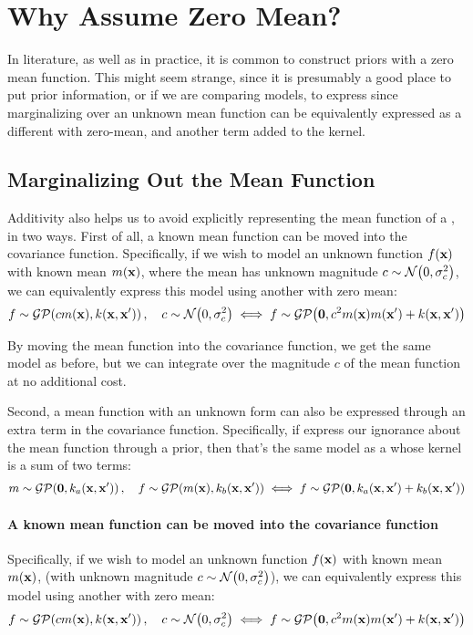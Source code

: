 \iffalse
\section{Why Assume Zero Mean?}

In literature, as well as in practice, it is common to construct \gp{} priors with a zero mean function.
This might seem strange, since it is presumably a good place to put prior information, or if we are comparing models, to express  since marginalizing over an unknown mean function can be equivalently expressed as a different \gp{} with zero-mean, and another term added to the kernel.


\subsection{Marginalizing Out the Mean Function}

Additivity also helps us to avoid explicitly representing the mean function of a \gp{}, in two ways.
First of all, a known mean function can be moved into the covariance function.
Specifically, if we wish to model an unknown function $f({\bf{x}})$ with known mean $m({\bf{x}})$, where the mean has unknown magnitude $c \sim \mathcal{N}\!\left(0,\sigma^2_c\right)$, we can equivalently express this model using another \gp{} with zero mean:
%
\begin{align}
f \sim \mathcal{GP}\!\left(c m({\bf{x}}),k({\bf{x}},{\bf{x}}')\right), \quad c \sim \mathcal{N}\!\left(0,\sigma^2_c\right)
\iff f \sim \mathcal{GP}\!\left( {\bf{0}} , c^2 m({\bf{x}}) m({\bf{x}}') + k({\bf{x}},{\bf{x}}')\right)
\end{align}

By moving the mean function into the covariance function, we get the same model as before, but we can integrate over the magnitude $c$ of the mean function at no additional cost.

Second, a mean function with an unknown form can also be expressed through an extra term in the covariance function.
Specifically, if express our ignorance about the mean function through a \gp{} prior, then that's the same model as a \gp{} whose kernel is a sum of two terms:
%
\begin{align}
m \sim \mathcal{GP}\!\left({\bf{0}},k_a({\bf{x}},{\bf{x}}')\right), \quad
f \sim \mathcal{GP}\!\left(m({\bf{x}}),k_b({\bf{x}},{\bf{x}}')\right)
\iff 
f \sim \mathcal{GP}\!\left({\bf{0}},k_a({\bf{x}},{\bf{x}}') + k_b({\bf{x}},{\bf{x}}')\right)
\end{align}



\paragraph{A known mean function can be moved into the covariance function}
Specifically, if we wish to model an unknown function $f({\bf{x}})$ with known mean $m({\bf{x}})$, (with unknown magnitude $c \sim \mathcal{N}\!\left(0,\sigma^2_c\right)$), we can equivalently express this model using another \gp{} with zero mean:
%
\begin{align}
f \sim \mathcal{GP}\!\left(c m({\bf{x}}),k({\bf{x}},{\bf{x}}')\right), \quad c \sim \mathcal{N}\!\left(0,\sigma^2_c\right)
\iff f \sim \mathcal{GP}\!\left( {\bf{0}} , c^2 m({\bf{x}}) m({\bf{x}}') + k({\bf{x}},{\bf{x}}')\right)
\end{align}

